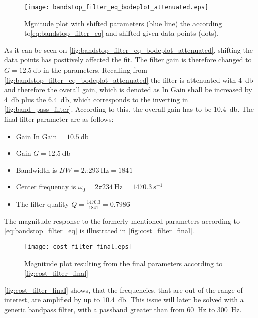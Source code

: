 \begin{figure}[H]
	\centering
	\texttt{[image: bandstop\_filter\_eq\_bodeplot\_attenuated.eps]}
	\caption{Mgnitude plot with shifted parameters (blue line) the according to\autoref{eq:bandstop_filter_eq} and shifted given data points (dots).}
		\label{fig:bandstop_filter_eq_bodeplot_attenuated}
\end{figure}


As it can be seen on \autoref{fig:bandstop_filter_eq_bodeplot_attenuated}, shifting the data points has positively affected the fit. The filter gain is therefore changed to  $G = \SI{12.5}{\decibel}$ in the parameters. Recalling from \autoref{fig:bandstop_filter_eq_bodeplot_attenuated} the filter is attenuated with \SI{4}{\decibel} and therefore the overall gain, which is denoted as $\text{In_Gain}$ shall be increased by \SI{4}{\decibel} plus the \SI{6.4}{\decibel}, which corresponds to the inverting in \autoref{fig:band_pass_filter}. According to this, the overall gain has to be \SI{10.4}{\decibel}. The final filter parameter are as follows:

\begin{itemize}
\item Gain $\text{In_Gain} = \SI{10.5}{\decibel}$
\item Gain $G = \SI{12.5}{\decibel}$
\item Bandwidth is $BW = 2\pi \SI{293}{\hertz} = 1841$
\item Center frequency is $\omega_0 = 2\pi \SI{234}{\hertz} = \SI{1470.3}{\second ^{-1}}$
\item The filter quality $Q = \frac{1470.3}{1841} = 0.7986$
\end{itemize}

The magnitude response to the formerly mentioned parameters according to \autoref{eq:bandstop_filter_eq} is illustrated in \autoref{fig:cost_filter_final}.

\begin{figure}[H]
	\centering
	\texttt{[image: cost\_filter\_final.eps]}
	\caption{Magnitude plot resulting from the final parameters according to \autoref{fig:cost_filter_final}}
		\label{fig:cost_filter_final}
\end{figure}

\autoref{fig:cost_filter_final} shows, that the frequencies, that are out of the range of interest, are amplified by up to \SI{10.4}{\decibel}. This issue will later be solved with a generic bandpass filter, with a passband greater than from \SI{60}{\hertz} to \SI{300}{\hertz}.
 


